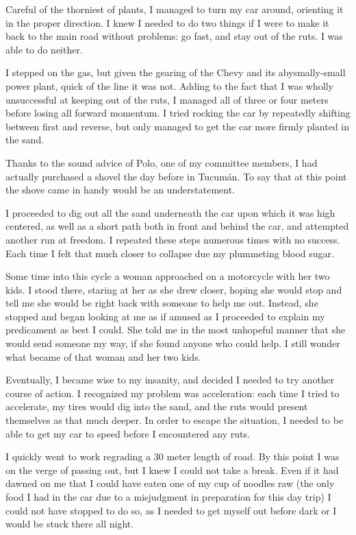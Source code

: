 {Careful of the thorniest of plants, I managed to turn my car around, orienting it in the proper direction. I knew I needed to do two things if I were to make it back to the main road without problems: go fast, and stay out of the ruts. I was able to do neither.

I stepped on the gas, but given the gearing of the Chevy and its abysmally-small power plant, quick of the line it was not. Adding to the fact that I was wholly unsuccessful at keeping out of the ruts, I managed all of three or four meters before losing all forward momentum. I tried rocking the car by repeatedly shifting between first and reverse, but only managed to get the car more firmly planted in the sand.

Thanks to the sound advice of Polo, one of my committee members, I had actually purchased a shovel the day before in Tucumán. To say that at this point the shove came in handy would be an understatement.

I proceeded to dig out all the sand underneath the car upon which it was high centered, as well as a short path both in front and behind the car, and attempted another run at freedom. I repeated these steps numerous times with no success. Each time I felt that much closer to collapse due my plummeting blood sugar.

Some time into this cycle a woman approached on a motorcycle with her two kids. I stood there, staring at her as she drew closer, hoping she would stop and tell me she would be right back with someone to help me out. Instead, she stopped and began looking at me as if amused as I proceeded to explain my predicament as best I could. She told me in the most unhopeful manner that she would send someone my way, if she found anyone who could help. I still wonder what became of that woman and her two kids.

Eventually, I became wise to my insanity, and decided I needed to try another course of action. I recognized my problem was acceleration: each time I tried to accelerate, my tires would dig into the sand, and the ruts would present themselves as that much deeper. In order to escape the situation, I needed to be able to get my car to speed before I encountered any ruts.

I quickly went to work regrading a 30 meter length of road. By this point I was on the verge of passing out, but I knew I could not take a break. Even if it had dawned on me that I could have eaten one of my cup of noodles raw (the only food I had in the car due to a misjudgment in preparation for this day trip) I could not have stopped to do so, as I needed to get myself out before dark or I would be stuck there all night.

}
